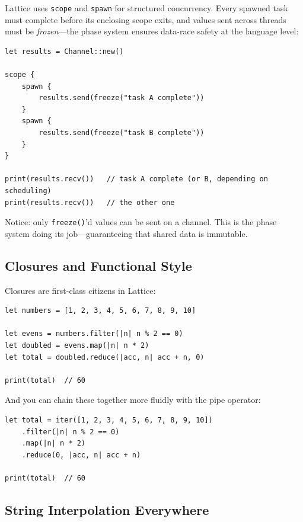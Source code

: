Lattice uses \lstinline|scope| and \lstinline|spawn| for structured concurrency.
Every spawned task must complete before its enclosing scope exits, and values sent across threads must be \emph{frozen}---the phase system ensures data-race safety at the language level:

\begin{lstlisting}[language=Lattice, caption={Structured concurrency with channels}]
let results = Channel::new()

scope {
    spawn {
        results.send(freeze("task A complete"))
    }
    spawn {
        results.send(freeze("task B complete"))
    }
}

print(results.recv())   // task A complete (or B, depending on scheduling)
print(results.recv())   // the other one
\end{lstlisting}

Notice: only \lstinline|freeze()|'d values can be sent on a channel.
This is the phase system doing its job---guaranteeing that shared data is immutable.

\subsection{Closures and Functional Style}\label{subsec:closures-taste}

Closures are first-class citizens in Lattice:

\begin{lstlisting}[language=Lattice, caption={Closures and higher-order functions}]
let numbers = [1, 2, 3, 4, 5, 6, 7, 8, 9, 10]

let evens = numbers.filter(|n| n % 2 == 0)
let doubled = evens.map(|n| n * 2)
let total = doubled.reduce(|acc, n| acc + n, 0)

print(total)  // 60
\end{lstlisting}

And you can chain these together more fluidly with the pipe operator:

\begin{lstlisting}[language=Lattice, caption={Chaining transforms with iterators}]
let total = iter([1, 2, 3, 4, 5, 6, 7, 8, 9, 10])
    .filter(|n| n % 2 == 0)
    .map(|n| n * 2)
    .reduce(0, |acc, n| acc + n)

print(total)  // 60
\end{lstlisting}

\subsection{String Interpolation Everywhere}\label{subsec:interpolation-taste}

